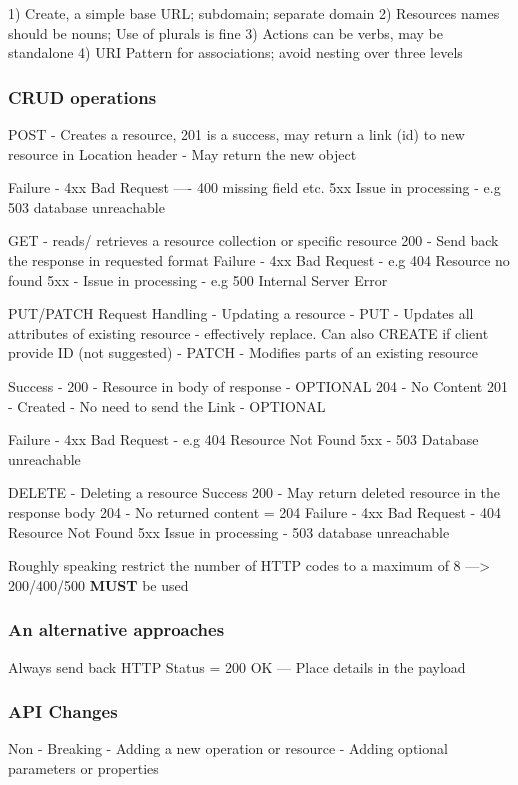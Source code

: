 1) Create, a simple base URL; subdomain; separate domain
2) Resources names should be nouns; Use of plurals is fine
3) Actions can be verbs, may be standalone
4) URI Pattern for associations; avoid nesting over three levels

\subsubsection{CRUD operations}
POST - Creates a resource,
201 is a success, may return a link (id) to new resource in Location header
- May return the new object

Failure - 4xx Bad Request ---- 400 missing field etc.
5xx Issue in processing - e.g 503 database unreachable

GET - reads/ retrieves a resource collection or specific resource
200 - Send back the response in requested format
Failure - 4xx Bad Request - e.g 404 Resource no found
5xx - Issue in processing - e.g 500 Internal Server Error

PUT/PATCH Request Handling - Updating a resource
- PUT - Updates all attributes of existing resource - effectively replace.
Can also CREATE if client provide ID (not suggested)
- PATCH - Modifies parts of an existing resource

Success - 200 - Resource in body of response - OPTIONAL
204 - No Content
201 - Created - No need to send the Link - OPTIONAL

Failure - 4xx Bad Request - e.g 404 Resource Not Found
5xx - 503 Database unreachable

DELETE - Deleting a resource
Success 200 - May return deleted resource in the response body
204 - No returned content = 204
Failure - 4xx Bad Request - 404 Resource Not Found
5xx Issue in processing - 503 database unreachable

Roughly speaking restrict the number of HTTP codes to a maximum of 8
---> 200/400/500 \textbf{MUST} be used

\subsubsection{An alternative approaches}
Always send back HTTP Status = 200 OK
--- Place details in the payload

\subsubsection{API Changes}
Non - Breaking
- Adding a new operation or resource
- Adding optional parameters or properties

